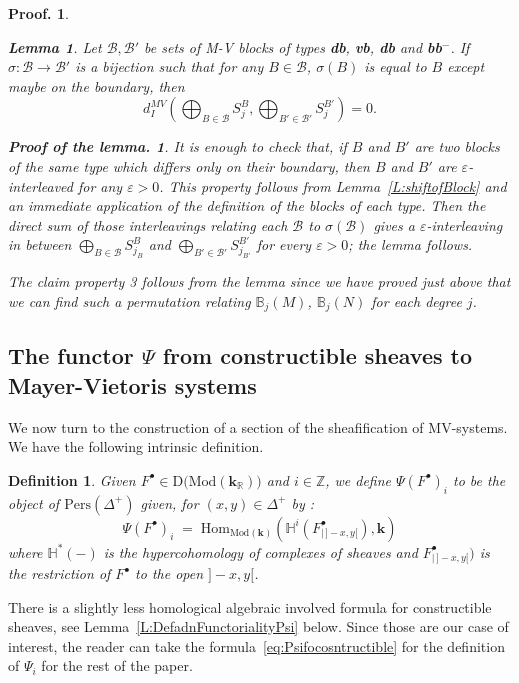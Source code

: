 \documentclass[a4paper, english, 11pt]{article}
\newcommand{\kk}[0]{\textbf{k}}
\newcommand{\Mod}[0]{\text{Mod}}
\newcommand{\0}{\vec{0}}
\newcommand{\Z}[0]{\mathbb{Z}}
\newcommand{\D}[0]{\text{D}}
\newcommand{\Hom}[0]{\text{Hom}}
\newcommand{\Pers}[0]{\text{Pers}}
\newtheorem*{pf}{Proof.} }
\newtheorem*{pfofLemma}{Proof of the lemma.} }
\newtheorem{lem}[prop]{Lemma}
\newtheorem{defi}[prop]{Definition}
\begin{document}
\begin{pf}
\begin{lem} Let $\mathcal{B}, \mathcal{B}'$ be sets of M-V blocks of types \textbf{db}, \textbf{vb}, \textbf{db} and \textbf{bb}$^-$. 
If $\sigma: \mathcal{B} \to \mathcal{B}'$ is a bijection such that for any $B\in \mathcal{B}$, $\sigma(B)$ is equal to $B$ except maybe on the boundary, then 
$$d_I^{MV}\left(\bigoplus_{B\in \mathcal{B}} S^B_{j}, \bigoplus_{B'\in \mathcal{B}'} S^{B'}_{j}\right) =0.$$
\end{lem}
\begin{pfofLemma} It is enough to check that,
 if $B$ and $B'$ are two blocks of the same type which differs only on their boundary, then $B$ and $B'$ are $\varepsilon$-interleaved for any $\varepsilon >0$. This property follows from Lemma~\ref{L:shiftofBlock} and an immediate application of the definition of the blocks of each type. 
 Then  the direct sum of those interleavings relating each $\mathcal{B}$ to $\sigma(\mathcal{B})$  gives a $\varepsilon$-interleaving in between $\bigoplus_{B\in \mathcal{B}} S^B_{j_B}$ and  $\bigoplus_{B'\in \mathcal{B}'} S^{B'}_{j_{B'}}$ for every $\varepsilon >0$; the lemma follows.
\end{pfofLemma}
The  claim property 3 follows from the lemma since we have proved just above that we can find such a 
permutation relating $\mathbb{B}_j(M)$, $\mathbb{B}_j(N)$ for each degree $j$.
\end{pf}



\subsection{ The functor $\Psi$ from constructible sheaves to Mayer-Vietoris systems}\label{SS:Psi}
We now turn to the construction of a section of the sheafification of MV-systems. We have the following intrinsic definition. 
\begin{defi}\label{def:Psi}Given $F^\bullet \in \D \big(\Mod(\kk_{\mathbb{R}})\big)$ and $i \in \Z$, we define  $\Psi(F^\bullet)_i$ to be the object of $\Pers(\Delta^+)$ given, for $(x,y)\in \Delta^+$ by :
\begin{equation}\label{eq:defPsiHypercohom}
 \Psi(F^\bullet)_i \; = \; \Hom_{\Mod(\kk)}\left ( \mathbb{H}^i(F^\bullet_{|\, ]-x,y[}), \kk\right)
\end{equation}
where $\mathbb{H}^*(-)$ is the hypercohomology of  complexes of sheaves and $F^\bullet_{|\, ]-x,y[})$ is the restriction of $F^\bullet$ to the open $]-x, y[$.  
\end{defi}
There is a slightly less homological algebraic involved formula for constructible sheaves, see Lemma~\ref{L:DefadnFunctorialityPsi} below.  Since
those are our case of interest, the reader can take the formula~\eqref{eq:Psifocosntructible} for the definition of $\Psi_i$ for the rest of the paper. 
\end{document}
